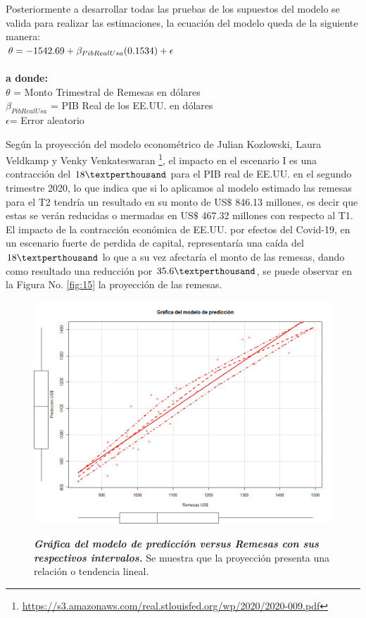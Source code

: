 Posteriormente a desarrollar todas las pruebas de los supuestos del modelo se valida para realizar las estimaciones, la ecuación del modelo queda de la siguiente manera:\\


$
{\large \theta=-1542.69+\beta_{PibRealUsa}(0.1534)+\epsilon}
$
\\
\\
\textbf{a donde:}\\
$\theta$ = Monto Trimestral de Remesas en dólares\\
$\beta_{PibRealUsa}$ = PIB Real de los EE.UU. en dólares\\
$\epsilon $= Error aleatorio\\

{\large }


\newpage

Según la proyección del modelo econométrico de \cite{kozlowski2020scarring}  Julian Kozlowski, Laura Veldkamp y Venky Venkateswaran \footnote{\href{https://s3.amazonaws.com/real.stlouisfed.org/wp/2020/2020-009.pdf}{https://s3.amazonaws.com/real.stlouisfed.org/wp/2020/2020-009.pdf}}, el impacto en el escenario I es una contracción del $18\textperthousand$ para el PIB real de EE.UU. en el segundo trimestre 2020, lo que indica que si lo aplicamos al modelo estimado las remesas para el T2 tendría un resultado en su monto de US$\$$ 846.13 millones, es decir que estas se verán reducidas o mermadas en US$\$$ 467.32 millones con respecto al T1. El impacto de la contracción económica de EE.UU. por efectos del Covid-19, en un escenario fuerte de perdida de capital, representaría una caída del $18\textperthousand$ lo que a su vez afectaría el monto de las remesas, dando como resultado una reducción  por $35.6 \textperthousand$, se puede observar en la Figura No. \eqref{fig:15} la proyección de las remesas.

\begin{figure}[H]
	\centering
	\resizebox{16.5 cm}{!} { 
		\includegraphics[width=1\linewidth]{Imagenes/Prediccion}}
	\caption{\textbf{\textit{Gráfica del modelo de predicción versus Remesas con sus respectivos intervalos.}}
		{\small Se muestra que la proyección presenta una relación o tendencia lineal.}
	} 
	\label{fig:15}
	
\end{figure}


